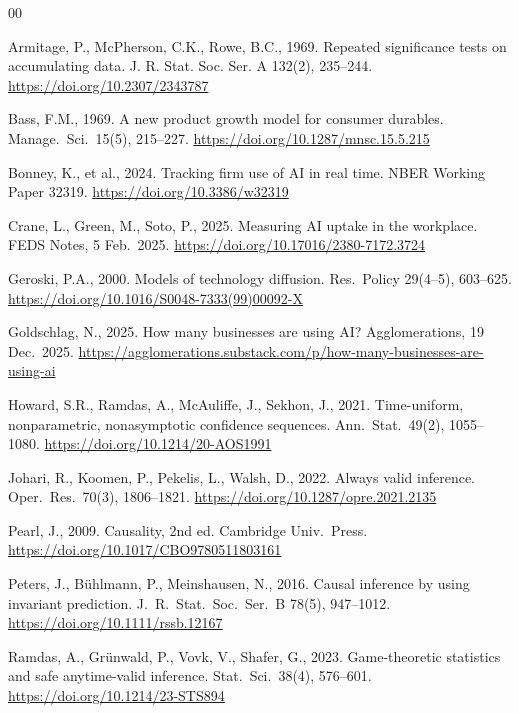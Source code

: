 \documentclass[preprint,12pt]{elsarticle}
\begin{document}

\begin{thebibliography}{00}

Armitage, P., McPherson, C.K., Rowe, B.C., 1969. Repeated significance tests on accumulating data. J. R. Stat. Soc. Ser. A 132(2), 235--244. \url{https://doi.org/10.2307/2343787}

Bass, F.M., 1969. A new product growth model for consumer durables. Manage.\ Sci.\ 15(5), 215--227. \url{https://doi.org/10.1287/mnsc.15.5.215}

Bonney, K., et al., 2024. Tracking firm use of AI in real time. NBER Working Paper 32319. \url{https://doi.org/10.3386/w32319}

Crane, L., Green, M., Soto, P., 2025. Measuring AI uptake in the workplace. FEDS Notes, 5 Feb.\ 2025. \url{https://doi.org/10.17016/2380-7172.3724}

Geroski, P.A., 2000. Models of technology diffusion. Res.\ Policy 29(4--5), 603--625. \url{https://doi.org/10.1016/S0048-7333(99)00092-X}

Goldschlag, N., 2025. How many businesses are using AI? Agglomerations, 19 Dec.\ 2025. \url{https://agglomerations.substack.com/p/how-many-businesses-are-using-ai}

Howard, S.R., Ramdas, A., McAuliffe, J., Sekhon, J., 2021. Time-uniform, nonparametric, nonasymptotic confidence sequences. Ann.\ Stat.\ 49(2), 1055--1080. \url{https://doi.org/10.1214/20-AOS1991}

Johari, R., Koomen, P., Pekelis, L., Walsh, D., 2022. Always valid inference. Oper.\ Res.\ 70(3), 1806--1821. \url{https://doi.org/10.1287/opre.2021.2135}

Pearl, J., 2009. Causality, 2nd ed. Cambridge Univ.\ Press. \url{https://doi.org/10.1017/CBO9780511803161}

Peters, J., B\"uhlmann, P., Meinshausen, N., 2016. Causal inference by using invariant prediction. J.\ R.\ Stat.\ Soc.\ Ser.\ B 78(5), 947--1012. \url{https://doi.org/10.1111/rssb.12167}

Ramdas, A., Gr\"unwald, P., Vovk, V., Shafer, G., 2023. Game-theoretic statistics and safe anytime-valid inference. Stat.\ Sci.\ 38(4), 576--601. \url{https://doi.org/10.1214/23-STS894}


\end{thebibliography}
\end{document}

